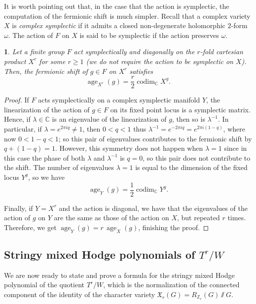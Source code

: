 \documentclass[11pt,english]{amsart}
\numberwithin{equation}{section}
\numberwithin{figure}{section}
\theoremstyle{plain}
\theoremstyle{plain}
\newtheorem{lem}[thm]{\protect\lemmaname}
\theoremstyle{definition}
\theoremstyle{remark}
\newcommand{\ZZ}{\mathbb{Z}}
\newcommand{\CC}{\mathbb{C}}
\newcommand{\codim}{\operatorname{codim}}
\newcommand{\age}{\operatorname{age}}
\providecommand{\lemmaname}{Lemma}
\begin{document}
It is worth pointing out that, in the case that the action is symplectic, the computation of the fermionic shift is much simpler. Recall that a complex variety $X$ is \emph{complex symplectic} if it admits a closed non-degenerate holomorphic $2$-form $\omega$. The action of $F$ on $X$ is said to be symplectic if the action preserves $\omega$. 

\begin{lem}\label{lem:fermionic-shift}
Let a finite group $F$ act symplectically and diagonally on the $r$-fold cartesian product $X^{r}$ for some $r \geq 1$ (we do not require the action to be symplectic on $X$). Then, the fermionic shift of $g \in F$ on $X^{r}$ satisfies 
$$\age_{X^{r}}(g) = \frac r2\codim_\CC X^g.$$
\end{lem}

\begin{proof} If $F$ acts symplectically on a complex symplectic manifold $Y$, the linearization of the action of $g \in F$ on its fixed point locus is a symplectic matrix. Hence, if $\lambda \in \CC$ is an eigenvalue of the linearization of $g$, then so is $\lambda^{-1}$. In particular, if 
$\lambda = e^{2\pi i q} \neq 1$, then $0 < q < 1$ thus $\lambda^{-1} = e^{-2 \pi i q} = e^{2\pi i (1-q)}$, where now $0 < 1-q < 1$; so this pair of eigenvalues contributes to the fermionic shift by $q + (1-q) = 1$. However, this symmetry does not happen when $\lambda = 1$ since in this case the phase of both $\lambda$ and $\lambda^{-1}$ is $q = 0$, so this pair does not contribute to the shift. The number of eigenvalues $\lambda = 1$ is equal to the dimension of the fixed locus $Y^g$, so we have
\begin{equation}\label{eq:age}
    \age_Y(g) = \frac{1}{2}\codim_\CC Y^g.
\end{equation}

Finally, if $Y=X^r$ and the action is diagonal, we have that the eigenvalues of the action of $g$ on $Y$ are the same as those of the action on $X$, but repeated $r$ times. Therefore, we get $\age_Y(g) = r\, \age_X(g)$, finishing the proof.
\end{proof}

\subsection{Stringy mixed Hodge polynomials of $T^r/W$}\label{section:stringy-CV}

We are now ready to state and prove a formula for the stringy mixed Hodge polynomial of the quotient $T^r/W$, which is the normalization of the connected component of the identity of the character variety $\mathfrak{X}_{r}(G) = R_{\ZZ_r}(G)\sslash G$.
\end{document}
